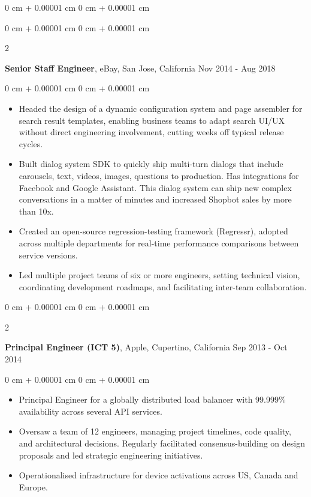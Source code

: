 \documentclass[10pt, letterpaper]{article}
\newenvironment{highlights}{
    \begin{itemize}[
        topsep=0.10 cm,
        parsep=0.10 cm,
        partopsep=0pt,
        itemsep=0pt,
        leftmargin=0 cm + 10pt
    ]
}{
    \end{itemize}
} %
\newenvironment{onecolentry}{
    \begin{adjustwidth}{
        0 cm + 0.00001 cm
    }{
        0 cm + 0.00001 cm
    }
}{
    \end{adjustwidth}
} %
\newenvironment{twocolentry}[2][]{
    \onecolentry
    \def\secondColumn{#2}
    \setcolumnwidth{\fill, 4.5 cm}
    \begin{paracol}{2}
}{
    \switchcolumn \raggedleft \secondColumn
    \end{paracol}
    \endonecolentry
} %
\begin{document}
\begin{onecolentry}
\begin{highlights}
        \vspace{0.15 cm}
        \begin{twocolentry}{
            Nov 2014 - Aug 2018
        }
            \textbf{Senior Staff Engineer}, eBay, San Jose, California\end{twocolentry}
        \vspace{0.10 cm}
        \begin{onecolentry}
            \begin{highlights}
                \item Headed the design of a dynamic configuration system and page assembler for search result templates, enabling business teams to adapt search UI/UX without direct engineering involvement, cutting weeks off typical release cycles.
                \item Built dialog system SDK to quickly ship multi-turn dialogs that include carousels, text, videos, images, questions to production. Has integrations for Facebook and Google Assistant. This dialog system can ship new complex conversations in a matter of minutes and increased Shopbot sales by more than 10x.
                \item Created an open-source regression-testing framework (Regressr), adopted across multiple departments for real-time performance comparisons between service versions.
                \item Led multiple project teams of six or more engineers, setting technical vision, coordinating development roadmaps, and facilitating inter-team collaboration.
            \end{highlights}
        \end{onecolentry}

        \vspace{0.15 cm}
        \begin{twocolentry}{
            Sep 2013 - Oct 2014
        }
            \textbf{Principal Engineer (ICT 5)}, Apple, Cupertino, California\end{twocolentry}
        \vspace{0.10 cm}
        \begin{onecolentry}
            \begin{highlights}
                \item Principal Engineer for a globally distributed load balancer with 99.999\% availability across several API services.
                \item Oversaw a team of 12 engineers, managing project timelines, code quality, and architectural decisions. Regularly facilitated consensus-building on design proposals and led strategic engineering initiatives.
                \item Operationalised infrastructure for device activations across US, Canada and Europe.
            \end{highlights}
        \end{onecolentry}


\end{highlights}
\end{onecolentry}
\end{document}

